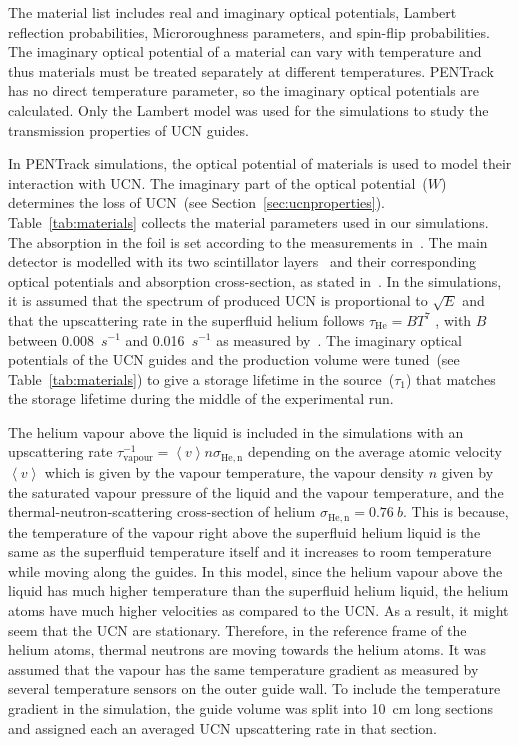 The material list includes real and imaginary optical potentials,
Lambert reflection probabilities, Microroughness parameters, and
spin-flip probabilities. The imaginary optical potential of a material
can vary with temperature and thus materials must be treated
separately at different temperatures. PENTrack has no direct
temperature parameter, so the imaginary optical potentials are
calculated. Only the Lambert model was used for the simulations to
study the transmission properties of UCN guides.





In PENTrack simulations, the optical potential of materials is used to
model their interaction with UCN. The imaginary part of the optical
potential~($W$) determines the loss of UCN~(see
Section~\ref{sec:ucnproperties}). Table~\ref{tab:materials} collects
the material parameters used in our simulations. The absorption in the
foil is set according to the measurements
in~\cite{atchison2009transmission}. The main detector is modelled with
its two scintillator layers~\cite{jamieson2017characterization} and
their corresponding optical potentials and absorption cross-section,
as stated in~\cite{Ban2016}. In the simulations, it is assumed that
the spectrum of produced UCN is proportional to $\sqrt{E}$ and that
the upscattering rate in the superfluid helium follows
$\tau_\mathrm{He} = B T^7$ , with $B$ between 0.008~$s^{-1}$ and
0.016~$s^{-1}$ as measured by~\cite{Leung2016}. The imaginary optical
potentials of the UCN guides and the production volume were tuned~(see
Table~\ref{tab:materials}) to give a storage lifetime in the
source~($\tau_1$) that matches the storage lifetime during the middle
of the experimental run.


The helium vapour above the liquid is included in the simulations with
an upscattering rate
$\tau^{-1}_\mathrm{vapour} = \left< v \right> n \sigma_\mathrm{He,n}$
depending on the average atomic velocity $\left < v \right>$ which is
given by the vapour temperature, the vapour density $n$ given by the
saturated vapour pressure of the liquid and the vapour temperature,
and the thermal-neutron-scattering cross-section of helium
$\sigma_\mathrm{He,n} = 0.76~b$. This is because, the temperature of
the vapour right above the superfluid helium liquid is the same as the
superfluid temperature itself and it increases to room temperature
while moving along the guides. In this model, since the helium vapour
above the liquid has much higher temperature than the superfluid
helium liquid, the helium atoms have much higher velocities as
compared to the UCN. As a result, it might seem that the UCN are
stationary. Therefore, in the reference frame of the helium atoms,
thermal neutrons are moving towards the helium atoms.  It was assumed
that the vapour has the same temperature gradient as measured by
several temperature sensors on the outer guide wall. To include the
temperature gradient in the simulation, the guide volume was split
into 10~cm long sections and assigned each an averaged UCN
upscattering rate in that section.


